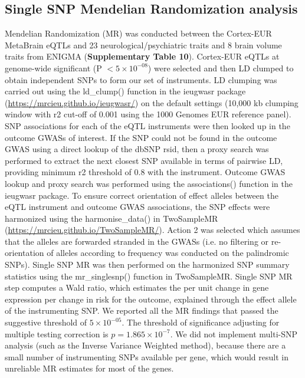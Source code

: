 \subsection{Single SNP Mendelian Randomization analysis}
Mendelian Randomization (MR) was conducted between the Cortex-EUR MetaBrain eQTLs and 23 neurological/psychiatric traits and 8 brain volume traits from ENIGMA (\textbf{Supplementary Table 10}). Cortex-EUR eQTLs at genome-wide significant (P $< 5 \times 10^{-08}$) were selected and then LD clumped to obtain independent SNPs to form our set of instruments. LD clumping was carried out using the ld\_clump() function in the ieugwasr package (\url{https://mrcieu.github.io/ieugwasr/}) on the default settings (10,000 kb clumping window with r2 cut-off of 0.001 using the 1000 Genomes EUR reference panel). SNP associations for each of the eQTL instruments were then looked up in the outcome GWASs of interest. If the SNP could not be found in the outcome GWAS using a direct lookup of the dbSNP rsid, then a proxy search was performed to extract the next closest SNP available in terms of pairwise LD, providing minimum r2 threshold of 0.8 with the instrument. Outcome GWAS lookup and proxy search was performed using the associations() function in the ieugwasr package. To ensure correct orientation of effect alleles between the eQTL instrument and outcome GWAS associations, the SNP effects were harmonized using the harmonise\_data() in TwoSampleMR (\url{https://mrcieu.github.io/TwoSampleMR/}). Action 2 was selected which assumes that the alleles are forwarded stranded in the GWASs (i.e. no filtering or re-orientation of alleles according to frequency was conducted on the palindromic SNPs). Single SNP MR was then performed on the harmonized SNP summary statistics using the mr\_singlesnp() function in TwoSampleMR. Single SNP MR step computes a Wald ratio, which estimates the per unit change in gene expression per change in risk for the outcome, explained through the effect allele of the instrumenting SNP. We reported all the MR findings that passed the suggestive threshold of $5 \times 10^{-05}$. The threshold of significance adjusting for multiple testing correction is $p=1.865 \times 10^{-7}$. We did not implement multi-SNP analysis (such as the Inverse Variance Weighted method), because there are a small number of instrumenting SNPs available per gene, which would result in unreliable MR estimates for most of the genes. 

